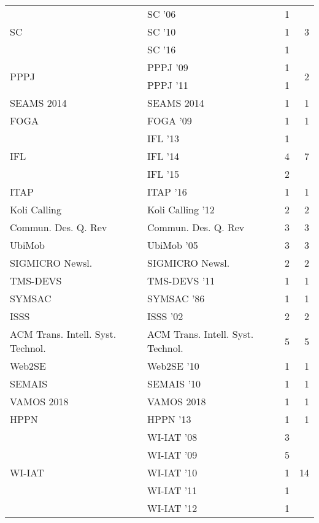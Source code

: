 \begin{table*}[t]
\begin{tabular}{llrr}
\multirow{3}{*}{SC } & SC '06 & 1 & \multirow{3}{*}{3}\\
& SC '10 & 1 &\\
& SC '16 & 1 &\\
\multirow{2}{*}{PPPJ } & PPPJ '09 & 1 & \multirow{2}{*}{2}\\
& PPPJ '11 & 1 &\\
\multirow{1}{*}{SEAMS 2014} & SEAMS 2014 & 1 & \multirow{1}{*}{1}\\
\multirow{1}{*}{FOGA } & FOGA '09 & 1 & \multirow{1}{*}{1}\\
\multirow{3}{*}{IFL } & IFL '13 & 1 & \multirow{3}{*}{7}\\
& IFL '14 & 4 &\\
& IFL '15 & 2 &\\
\multirow{1}{*}{ITAP } & ITAP '16 & 1 & \multirow{1}{*}{1}\\
\multirow{1}{*}{Koli Calling } & Koli Calling '12 & 2 & \multirow{1}{*}{2}\\
\multirow{1}{*}{Commun. Des. Q. Rev} & Commun. Des. Q. Rev & 3 & \multirow{1}{*}{3}\\
\multirow{1}{*}{UbiMob } & UbiMob '05 & 3 & \multirow{1}{*}{3}\\
\multirow{1}{*}{SIGMICRO Newsl.} & SIGMICRO Newsl. & 2 & \multirow{1}{*}{2}\\
\multirow{1}{*}{TMS-DEVS } & TMS-DEVS '11 & 1 & \multirow{1}{*}{1}\\
\multirow{1}{*}{SYMSAC } & SYMSAC '86 & 1 & \multirow{1}{*}{1}\\
\multirow{1}{*}{ISSS } & ISSS '02 & 2 & \multirow{1}{*}{2}\\
\multirow{1}{*}{ACM Trans. Intell. Syst. Technol.} & ACM Trans. Intell. Syst. Technol. & 5 & \multirow{1}{*}{5}\\
\multirow{1}{*}{Web2SE } & Web2SE '10 & 1 & \multirow{1}{*}{1}\\
\multirow{1}{*}{SEMAIS } & SEMAIS '10 & 1 & \multirow{1}{*}{1}\\
\multirow{1}{*}{VAMOS 2018} & VAMOS 2018 & 1 & \multirow{1}{*}{1}\\
\multirow{1}{*}{HPPN } & HPPN '13 & 1 & \multirow{1}{*}{1}\\
\multirow{7}{*}{WI-IAT } & WI-IAT '08 & 3 & \multirow{7}{*}{14}\\
& WI-IAT '09 & 5 &\\
& WI-IAT '10 & 1 &\\
& WI-IAT '11 & 1 &\\
& WI-IAT '12 & 1 &\\

\end{tabular}
\end{table*}
